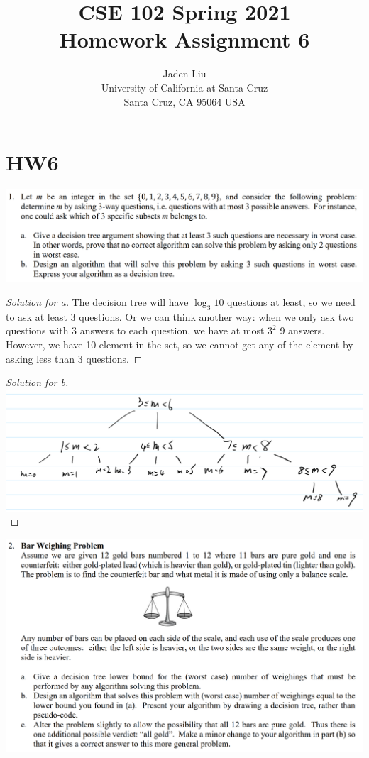 \documentclass[12pt]{article}
\begin{document}
\title{ CSE 102 Spring 2021\\
	Homework Assignment 6}

\author{Jaden Liu \\ 
University of California at Santa Cruz\\
Santa Cruz, CA 95064 USA }

\maketitle


\section{HW6} 
\includegraphics[scale=0.22]{1.png}
\begin{proof}[Solution for a]
	The decision tree will have $\log_{3}10$ questions at least, so we need to ask at least 3 questions. Or we can think another way: when we only ask two questions with 3 answers to each question, we have at most $3^2$ 9 answers. However, we have 10 element in the set, so we cannot get any of the element by asking less than 3 questions. 
\end{proof}
\begin{proof}[Solution for b]
	\ \\
	\includegraphics[scale=0.17]{1_2.png}
\end{proof}
\includegraphics[scale=0.22]{2.png}
\end{document}
